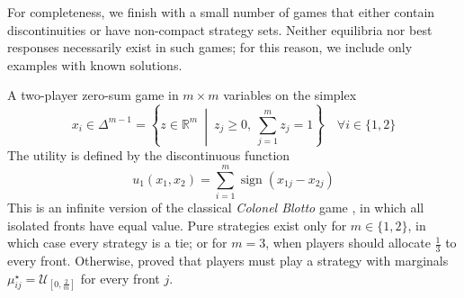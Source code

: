 

For completeness, we finish with a small number of games that either contain discontinuities or have non-compact strategy sets. Neither equilibria nor best responses necessarily exist in such games; for this reason, we include only examples with known solutions.

\begin{game}
A two-player zero-sum game in $m \times m$ variables on the simplex
\[
x_i \in \Delta^{m-1} = \left\{ z \in \mathbb{R}^m \ \middle|\ z_j \ge 0,\ \sum_{j=1}^m z_j = 1 \right\} \quad \forall i \in \{1,2\}
\]
The utility is defined by the discontinuous function
\[
u_1(x_1, x_2) = \sum_{i=1}^m \operatorname{sign}\left( x_{1j} - x_{2j} \right)
\]
This is an infinite version of the classical \emph{Colonel Blotto} game \cite{Laslier.colonel,Kvasov.colonel,gross.wagner.colonel,Golman2009}, in which all isolated fronts have equal value. Pure strategies exist only for $m \in \{1,2\}$, in which case every strategy is a tie; or for $m=3$, when players should allocate $\frac{1}{3}$ to every front. Otherwise, \textcite{roberson.colonel} proved that players must play a strategy with marginals $\mu^\star_{ij} = \mathcal{U}_{\left[0,\frac{2}{m}\right]}$ for every front $j$.
\end{game}

